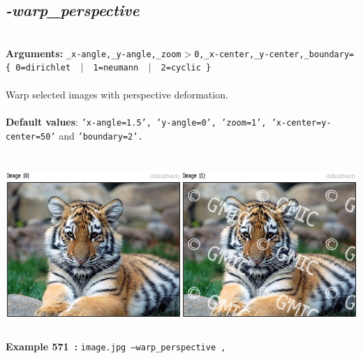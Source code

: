 \documentclass[a4paper,11pt,twoside]{book}
\begin{document}
\subsection{\emph{-warp\_perspective} }\vspace*{-0.5em}
~\\\textbf{Arguments: } 
{\small \texttt{\_x-angle,\_y-angle,\_zoom$>$0,\_x-center,\_y-center,\_boundary=\{ 0=dirichlet ~$|$~ 1=neumann ~$|$~ 2=cyclic \}}}\\~\\
Warp selected images with perspective deformation.
~\\~\\\textbf{Default values}: {\small \texttt{'x-angle=1.5', 'y-angle=0', 'zoom=1', 'x-center=y-center=50'} and \texttt{'boundary=2'.}}
\begin{center}\includegraphics[keepaspectratio=true,height=7cm,width=\textwidth]{img/gmic_def571.jpg}\\
{\footnotesize \textbf{Example 571~:} \texttt{image.jpg --warp\_perspective ,}}
\end{center}
\end{document}
